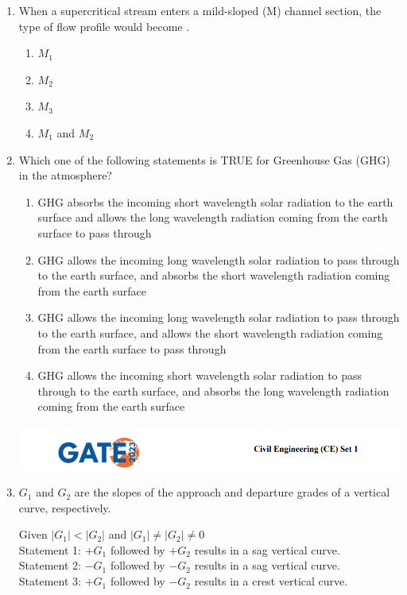 \documentclass[journal,14pt,onecolumn]{IEEEtran}
\theoremstyle{remark}
\begin{document}
\begin{enumerate}[label={Q\arabic*.}]
\item When a supercritical stream enters a mild-sloped (M) channel section, the type of flow profile would become \underline{\hspace{2cm}}.
\begin{enumerate}
    \item $M_1$
    \item $M_2$
    \item $M_3$
    \item $M_1$ and $M_2$
\end{enumerate}
\vspace{1cm}

\item Which one of the following statements is TRUE for Greenhouse Gas (GHG) in the atmosphere?
\begin{enumerate}
    \item GHG absorbs the incoming short wavelength solar radiation to the earth surface and allows the long wavelength radiation coming from the earth surface to pass through
    \item GHG allows the incoming long wavelength solar radiation to pass through to the earth surface, and absorbs the short wavelength radiation coming from the earth surface
    \item GHG allows the incoming long wavelength solar radiation to pass through to the earth surface, and allows the short wavelength radiation coming from the earth surface to pass through
    \item GHG allows the incoming short wavelength solar radiation to pass through to the earth surface, and absorbs the long wavelength radiation coming from the earth surface
\end{enumerate}

\newpage

\includegraphics[width=\textwidth]{pics/header.png}
\item $G_1$ and $G_2$ are the slopes of the approach and departure grades of a vertical curve, respectively.

\noindent
Given $|G_1| < |G_2|$ and $|G_1| \neq |G_2| \neq 0$\\
Statement 1: $+G_1$ followed by $+G_2$ results in a sag vertical curve.\\
Statement 2: $-G_1$ followed by $-G_2$ results in a sag vertical curve.\\
Statement 3: $+G_1$ followed by $-G_2$ results in a crest vertical curve.\\


\end{enumerate}
\end{document}
